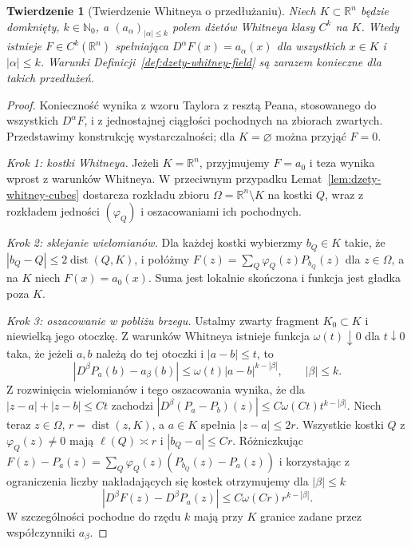 \documentclass[11pt,a4paper,oneside]{book}
\numberwithin{equation}{chapter}
\theoremstyle{plain}
\newtheorem{twierdzenie}{Twierdzenie}[chapter]
\theoremstyle{definition}
\theoremstyle{remark}
\begin{document}
\begin{twierdzenie}[Twierdzenie Whitneya o przedłużaniu]
\label{thm:dzety-whitney-extension}
Niech $K\subset\mathbb R^n$ będzie domknięty,
$k\in\mathbb N_0$, a $(a_\alpha)_{|\alpha|\le k}$
polem dżetów Whitneya klasy $C^k$ na $K$.
Wtedy istnieje $F\in C^k(\mathbb R^n)$ spełniająca
$D^\alpha F(x)=a_\alpha(x)$ dla wszystkich
$x\in K$ i $|\alpha|\le k$.
Warunki Definicji~\ref{def:dzety-whitney-field} są
zarazem konieczne dla takich przedłużeń.
\end{twierdzenie}

\begin{proof}
Konieczność wynika z wzoru Taylora z resztą Peana,
stosowanego do wszystkich $D^\alpha F$, i z jednostajnej
ciągłości pochodnych na zbiorach zwartych.
Przedstawimy konstrukcję wystarczalności; dla $K=\varnothing$
można przyjąć $F=0$.

\emph{Krok 1: kostki Whitneya.}
Jeżeli $K=\mathbb R^n$, przyjmujemy $F=a_0$
i teza wynika wprost z warunków Whitneya.
W przeciwnym przypadku Lemat~\ref{lem:dzety-whitney-cubes}
dostarcza rozkładu zbioru
$\Omega=\mathbb R^n\setminus K$
na kostki $Q$, wraz z rozkładem jedności
$(\varphi_Q)$ i oszacowaniami ich pochodnych.

\emph{Krok 2: sklejanie wielomianów.}
Dla każdej kostki wybierzmy $b_Q\in K$ takie, że
$|b_Q-Q|\le2\operatorname{dist}(Q,K)$, i połóżmy
$F(z)=\sum_Q\varphi_Q(z)P_{b_Q}(z)$ dla $z\in\Omega$,
a na $K$ niech $F(x)=a_0(x)$. Suma jest lokalnie skończona
i funkcja jest gładka poza $K$.

\emph{Krok 3: oszacowanie w pobliżu brzegu.}
Ustalmy zwarty fragment $K_0\subset K$ i niewielką
jego otoczkę. Z warunków Whitneya istnieje funkcja
$\omega(t)\downarrow0$ dla $t\downarrow0$ taka, że
jeżeli $a,b$ należą do tej otoczki i $|a-b|\le t$, to
\[
 |D^\beta P_a(b)-a_\beta(b)|
 \le\omega(t)|a-b|^{k-|\beta|},\qquad |\beta|\le k.
\]
Z rozwinięcia wielomianów i tego oszacowania wynika,
że dla $|z-a|+|z-b|\le Ct$ zachodzi
$|D^\beta(P_a-P_b)(z)|\le C\omega(Ct)t^{k-|\beta|}$.
Niech teraz $z\in\Omega$, $r=\operatorname{dist}(z,K)$,
a $a\in K$ spełnia $|z-a|\le2r$. Wszystkie kostki
$Q$ z $\varphi_Q(z)\ne0$ mają $\ell(Q)\asymp r$
i $|b_Q-a|\le Cr$. Różniczkując
$F(z)-P_a(z)=\sum_Q\varphi_Q(z)(P_{b_Q}(z)-P_a(z))$
i korzystając z ograniczenia liczby nakładających się
kostek otrzymujemy dla $|\beta|\le k$
\[
 |D^\beta F(z)-D^\beta P_a(z)|
 \le C\omega(Cr)r^{k-|\beta|}.
\]
W szczególności pochodne do rzędu $k$ mają przy $K$
granice zadane przez współczynniki $a_\beta$.


\end{proof}
\end{document}
